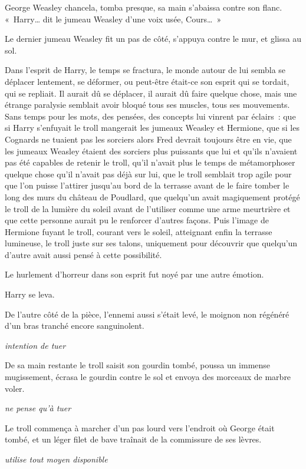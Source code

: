 George Weasley chancela, tomba presque, sa main s'abaissa contre son flanc.
«~Harry… dit le jumeau Weasley d'une voix usée, Cours…~»

Le dernier jumeau Weasley fit un pas de côté, s'appuya contre le mur, et glissa au sol.

Dans l'esprit de Harry, le temps se fractura, le monde autour de lui sembla se déplacer lentement, se déformer, ou peut-être était-ce son esprit qui se tordait, qui se repliait.
Il aurait dû se déplacer, il aurait dû faire quelque chose, mais une étrange paralysie semblait avoir bloqué tous ses muscles, tous ses mouvements.
Sans temps pour les mots, des pensées, des concepts lui vinrent par éclairs~: que si Harry s'enfuyait le troll mangerait les jumeaux Weasley et Hermione, que si les Cognards ne tuaient pas les sorciers alors Fred devrait toujours être en vie, que les jumeaux Weasley étaient des sorciers plus puissants que lui et qu'ils n'avaient pas été capables de retenir le troll, qu'il n'avait plus le temps de métamorphoser quelque chose qu'il n'avait pas déjà sur lui, que le troll semblait trop agile pour que l'on puisse l'attirer jusqu'au bord de la terrasse avant de le faire tomber le long des murs du château de Poudlard, que quelqu'un avait magiquement protégé le troll de la lumière du soleil avant de l'utiliser comme une arme meurtrière et que cette personne aurait pu le renforcer d'autres façons.
Puis l'image de Hermione fuyant le troll, courant vers le soleil, atteignant enfin la terrasse lumineuse, le troll juste sur ses talons, uniquement pour découvrir que quelqu'un d'autre avait aussi pensé à cette possibilité.

Le hurlement d'horreur dans son esprit fut noyé par une autre émotion.

Harry se leva.

De l'autre côté de la pièce, l'ennemi aussi s'était levé, le moignon non régénéré d'un bras tranché encore sanguinolent.

\emph{intention de tuer}

De sa main restante le troll saisit son gourdin tombé, poussa un immense mugissement, écrasa le gourdin contre le sol et envoya des morceaux de marbre voler.

\emph{ne pense qu'à tuer}

Le troll commença à marcher d'un pas lourd vers l'endroit où George était tombé, et un léger filet de bave traînait de la commissure de ses lèvres.

\emph{utilise tout moyen disponible}

